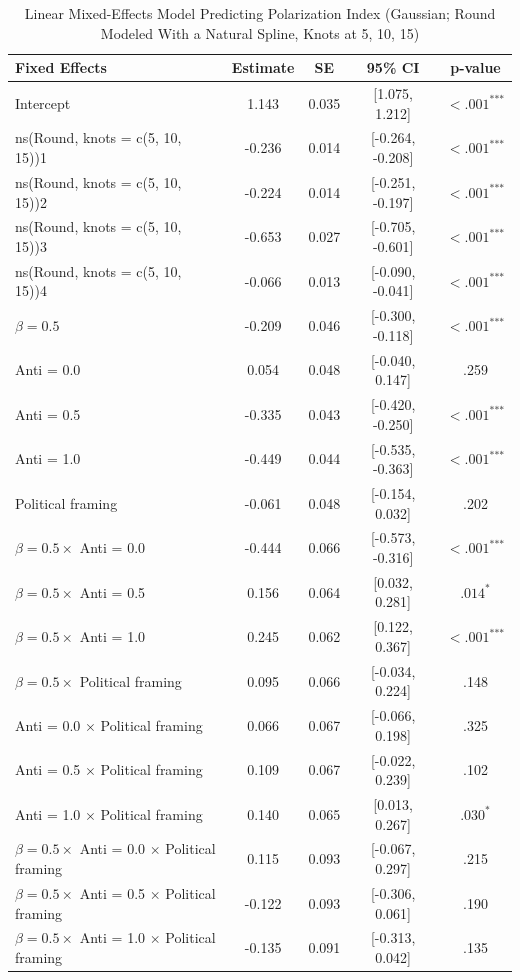 \begin{table}[H]
\centering
\caption{Linear Mixed-Effects Model Predicting Polarization Index (Gaussian; Round Modeled With a Natural Spline, Knots at 5, 10, 15)}
\label{tab:best_gauss}
\begingroup
\footnotesize
\renewcommand{\arraystretch}{0.90} %

\begin{tabularx}{\linewidth}{Xcccc}
\toprule
\textbf{Fixed Effects} & \textbf{Estimate} & \textbf{SE} & \textbf{95\% CI} & \textbf{p-value} \\
\midrule
Intercept & 1.143 & 0.035 & [1.075, 1.212] & $< .001^{\text{***}}$ \\
ns(Round, knots = c(5, 10, 15))1 & -0.236 & 0.014 & [-0.264, -0.208] & $< .001^{\text{***}}$ \\
ns(Round, knots = c(5, 10, 15))2 & -0.224 & 0.014 & [-0.251, -0.197] & $< .001^{\text{***}}$ \\
ns(Round, knots = c(5, 10, 15))3 & -0.653 & 0.027 & [-0.705, -0.601] & $< .001^{\text{***}}$ \\
ns(Round, knots = c(5, 10, 15))4 & -0.066 & 0.013 & [-0.090, -0.041] & $< .001^{\text{***}}$ \\
$\beta = 0.5$ & -0.209 & 0.046 & [-0.300, -0.118] & $< .001^{\text{***}}$ \\
Anti = 0.0 & 0.054 & 0.048 & [-0.040, 0.147] & .259 \\
Anti = 0.5 & -0.335 & 0.043 & [-0.420, -0.250] & $< .001^{\text{***}}$ \\
Anti = 1.0 & -0.449 & 0.044 & [-0.535, -0.363] & $< .001^{\text{***}}$ \\
Political framing & -0.061 & 0.048 & [-0.154, 0.032] & .202 \\
$\beta = 0.5 \times$ Anti = 0.0 & -0.444 & 0.066 & [-0.573, -0.316] & $< .001^{\text{***}}$ \\
$\beta = 0.5 \times$ Anti = 0.5 & 0.156 & 0.064 & [0.032, 0.281] & $.014^{\text{*}}$ \\
$\beta = 0.5 \times$ Anti = 1.0 & 0.245 & 0.062 & [0.122, 0.367] & $< .001^{\text{***}}$ \\
$\beta = 0.5 \times$ Political framing & 0.095 & 0.066 & [-0.034, 0.224] & .148 \\
Anti = 0.0 $\times$ Political framing & 0.066 & 0.067 & [-0.066, 0.198] & .325 \\
Anti = 0.5 $\times$ Political framing & 0.109 & 0.067 & [-0.022, 0.239] & .102 \\
Anti = 1.0 $\times$ Political framing & 0.140 & 0.065 & [0.013, 0.267] & $.030^{\text{*}}$ \\
$\beta = 0.5 \times$ Anti = 0.0 $\times$ Political framing & 0.115 & 0.093 & [-0.067, 0.297] & .215 \\
$\beta = 0.5 \times$ Anti = 0.5 $\times$ Political framing & -0.122 & 0.093 & [-0.306, 0.061] & .190 \\
$\beta = 0.5 \times$ Anti = 1.0 $\times$ Political framing & -0.135 & 0.091 & [-0.313, 0.042] & .135 \\


\end{tabularx}
\end{table}
